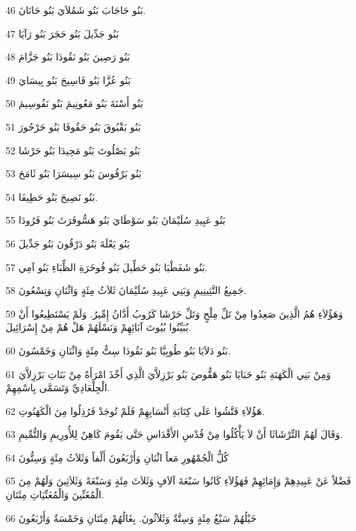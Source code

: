 \par 46 بَنُو حَاجَابَ بَنُو شَمُلاَيَ بَنُو حَانَانَ.
\par 47 بَنُو جَدِّيلَ بَنُو حَجَرَ بَنُو رَآيَا
\par 48 بَنُو رَصِينَ بَنُو نَقُودَا بَنُو جَزَّامَ
\par 49 بَنُو عُزَّا بَنُو فَاسِيحَ بَنُو بِيسَايَ
\par 50 بَنُو أَسْنَةَ بَنُو مَعُونِيمَ بَنُو نَفُوسِيمَ
\par 51 بَنُو بَقْبُوقَ بَنُو حَقُوفَا بَنُو حَرْحُورَ
\par 52 بَنُو بَصْلُوتَ بَنُو مَحِيدَا بَنُو حَرْشَا
\par 53 بَنُو بَرْقُوسَ بَنُو سِيسَرَا بَنُو ثَامَحَ
\par 54 بَنُو نَصِيحَ بَنُو حَطِيفَا.
\par 55 بَنُو عَبِيدِ سُلَيْمَانَ بَنُو سَوْطَايَ بَنُو هَسُّوفَرَثَ بَنُو فَرُودَا
\par 56 بَنُو يَعْلَةَ بَنُو دَرْقُونَ بَنُو جَدِّيلَ
\par 57 بَنُو شَفَطْيَا بَنُو حَطِّيلَ بَنُو فُوخَرَةِ الظِّبَاءِ بَنُو آمِي.
\par 58 جَمِيعُ النَّثِينِيمِ وَبَنِي عَبِيدِ سُلَيْمَانَ ثَلاَثُ مِئَةٍ وَاثْنَانِ وَتِسْعُونَ.
\par 59 وَهَؤُلاَءِ هُمُ الَّذِينَ صَعِدُوا مِنْ تَلِّ مِلْحٍ وَتَلِّ حَرْشَا كَرُوبُ أَدَّانُ إِمِّيرُ. وَلَمْ يَسْتَطِيعُوا أَنْ يُبَيِّنُوا بُيُوتَ آبَائِهِمْ وَنَسْلَهُمْ هَلْ هُمْ مِنْ إِسْرَائِيلَ.
\par 60 بَنُو دَلاَيَا بَنُو طُوبِيَّا بَنُو نَقُودَا سِتُّ مِئَةٍ وَاثْنَانِ وَخَمْسُونَ.
\par 61 وَمِنْ بَنِي الْكَهَنَةِ بَنُو حَبَايَا بَنُو هَقُّوصَ بَنُو بَرْزِلاَّيَ الَّذِي أَخْذَ امْرَأَةً مِنْ بَنَاتِ بَرْزِلاَّيَ الْجِلْعَادِيِّ وَتَسَمَّى بِاسْمِهِمْ.
\par 62 هَؤُلاَءِ فَتَّشُوا عَلَى كِتَابَةِ أَنْسَابِهِمْ فَلَمْ تُوجَدْ فَرُذِلُوا مِنَ الْكَهَنُوتِ.
\par 63 وَقَالَ لَهُمُ التِّرْشَاثَا أَنْ لاَ يَأْكُلُوا مِنْ قُدْسِ الأَقْدَاسِ حَتَّى يَقُومَ كَاهِنٌ لِلأُورِيمِ وَالتُّمِّيمِ.
\par 64 كُلُّ الْجُمْهُورِ مَعاً اثْنَانِ وَأَرْبَعُونَ أَلْفاً وَثَلاَثُ مِئَةٍ وَسِتُّونَ
\par 65 فَضْلاً عَنْ عَبِيدِهِمْ وَإِمَائِهِمْ فَهَؤُلاَءِ كَانُوا سَبْعَةَ آلاَفٍ وَثَلاَثَ مِئَةٍ وَسَبْعَةً وَثَلاَثِينَ وَلَهُمْ مِنَ الْمُغَنِّينَ وَالْمُغَنِّيَاتِ مِئَتَانِ.
\par 66 خَيْلُهُمْ سَبْعُ مِئَةٍ وَسِتَّةٌ وَثَلاَثُونَ. بِغَالُهُمْ مِئَتَانِ وَخَمْسَةٌ وَأَرْبَعُونَ
